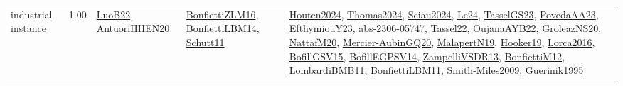 {\begin{longtable}{p{3cm}r>{\raggedright\arraybackslash}p{6cm}>{\raggedright\arraybackslash}p{6cm}>{\raggedright\arraybackslash}p{8cm}}
\index{industrial instance}\index{Benchmarks!industrial instance}industrial instance &  1.00 & \hyperref[detail:LuoB22]{LuoB22}, \hyperref[detail:AntuoriHHEN20]{AntuoriHHEN20} & \hyperref[detail:BonfiettiZLM16]{BonfiettiZLM16}, \hyperref[detail:BonfiettiLBM14]{BonfiettiLBM14}, \hyperref[detail:Schutt11]{Schutt11} & \hyperref[detail:Houten2024]{Houten2024}, \hyperref[detail:Thomas2024]{Thomas2024}, \hyperref[detail:Sciau2024]{Sciau2024}, \hyperref[detail:Le24]{Le24}, \hyperref[detail:TasselGS23]{TasselGS23}, \hyperref[detail:PovedaAA23]{PovedaAA23}, \hyperref[detail:EfthymiouY23]{EfthymiouY23}, \hyperref[detail:abs-2306-05747]{abs-2306-05747}, \hyperref[detail:Tassel22]{Tassel22}, \hyperref[detail:OujanaAYB22]{OujanaAYB22}, \hyperref[detail:GroleazNS20]{GroleazNS20}, \hyperref[detail:NattafM20]{NattafM20}, \hyperref[detail:Mercier-AubinGQ20]{Mercier-AubinGQ20}, \hyperref[detail:MalapertN19]{MalapertN19}, \hyperref[detail:Hooker19]{Hooker19}, \hyperref[detail:Lorca2016]{Lorca2016}, \hyperref[detail:BofillGSV15]{BofillGSV15}, \hyperref[detail:BofillEGPSV14]{BofillEGPSV14}, \hyperref[detail:ZampelliVSDR13]{ZampelliVSDR13}, \hyperref[detail:BonfiettiM12]{BonfiettiM12}, \hyperref[detail:LombardiBMB11]{LombardiBMB11}, \hyperref[detail:BonfiettiLBM11]{BonfiettiLBM11}, \hyperref[detail:Smith-Miles2009]{Smith-Miles2009}, \hyperref[detail:Guerinik1995]{Guerinik1995}\\

\end{longtable}}
